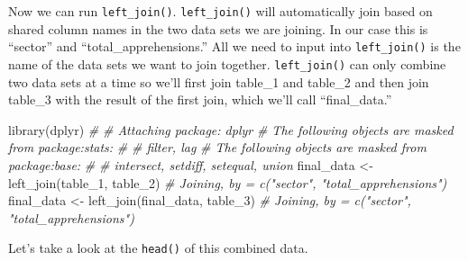 \documentclass[
]{krantz}
\makeatletter
\newenvironment{Shaded}{\begin{snugshade}}{\end{snugshade}}
\newcommand{\CommentTok}[1]{\textcolor[rgb]{0.37,0.37,0.37}{\textit{#1}}}
\newcommand{\FunctionTok}[1]{\textcolor[rgb]{0,0,0}{#1}}
\newcommand{\NormalTok}[1]{#1}
\newcommand{\OtherTok}[1]{\textcolor[rgb]{0.37,0.37,0.37}{#1}}
\newcommand{\SpecialCharTok}[1]{\textcolor[rgb]{0,0,0}{#1}}
\newcommand{\StringTok}[1]{\textcolor[rgb]{0.5,0.5,0.5}{#1}}
\newenvironment{kframe}{%
\medskip{}
\setlength{\fboxsep}{.8em}
 \def\at@end@of@kframe{}%
 \ifinner\ifhmode%
  \def\at@end@of@kframe{\end{minipage}}%
  \begin{minipage}{\columnwidth}%
 \fi\fi%
 \def\FrameCommand##1{\hskip\@totalleftmargin \hskip-\fboxsep
 \colorbox{shadecolor}{##1}\hskip-\fboxsep
     \hskip-\linewidth \hskip-\@totalleftmargin \hskip\columnwidth}%
 \MakeFramed {\advance\hsize-\width
   \@totalleftmargin\z@ \linewidth\hsize
   \@setminipage}}%
 {\par\unskip\endMakeFramed%
 \at@end@of@kframe}
\renewenvironment{Shaded}{\begin{kframe}}{\end{kframe}}
\makeatother
\begin{document}
\begin{Shaded}
\end{Shaded}

Now we can run \texttt{left\_join()}. \texttt{left\_join()}
will automatically join based on shared column names in the
two data sets we are joining. In our case this is ``sector''
and ``total\_apprehensions.'' All we need to input into
\texttt{left\_join()} is the name of the data sets we want
to join together. \texttt{left\_join()} can only combine two
data sets at a time so we'll first join table\_1 and
table\_2 and then join table\_3 with the result of the first
join, which we'll call ``final\_data.''

\begin{Shaded}
\begin{Highlighting}[]
\FunctionTok{library}\NormalTok{(dplyr)}
\CommentTok{\# }
\CommentTok{\# Attaching package: \textquotesingle{}dplyr\textquotesingle{}}
\CommentTok{\# The following objects are masked from \textquotesingle{}package:stats\textquotesingle{}:}
\CommentTok{\# }
\CommentTok{\#     filter, lag}
\CommentTok{\# The following objects are masked from \textquotesingle{}package:base\textquotesingle{}:}
\CommentTok{\# }
\CommentTok{\#     intersect, setdiff, setequal, union}
\NormalTok{final\_data }\OtherTok{\textless{}{-}} \FunctionTok{left\_join}\NormalTok{(table\_1, table\_2)}
\CommentTok{\# Joining, by = c("sector", "total\_apprehensions")}
\NormalTok{final\_data }\OtherTok{\textless{}{-}} \FunctionTok{left\_join}\NormalTok{(final\_data, table\_3)}
\CommentTok{\# Joining, by = c("sector", "total\_apprehensions")}
\end{Highlighting}
\end{Shaded}

Let's take a look at the \texttt{head()} of this combined
data.
\end{document}
